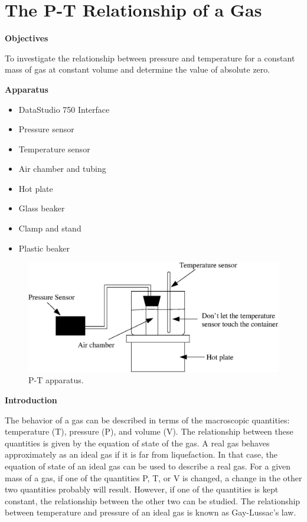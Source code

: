 
\section{The P-T Relationship of a Gas}

\makelabheader %

\textbf{Objectives} 

To investigate the relationship between pressure and temperature for
a constant mass of gas at constant volume and determine the value
of absolute zero.

\textbf{Apparatus} 

\begin{itemize}
\item DataStudio 750 Interface
\item Pressure sensor
\item Temperature sensor
\item Air chamber and tubing
\item Hot plate
\item Glass beaker
\item Clamp and stand
\item Plastic beaker
\end{itemize}
\vspace{0.3cm}

\begin{figure}[hbt]
\begin{center}
\includegraphics[width=6.0in]{P-T_relationship_of_gas/P-T_fig1b.eps}
\caption{P-T apparatus.}
\end{center}
\end{figure}

\textbf{Introduction}

The behavior of a gas can be described in terms of the macroscopic quantities:
temperature (T), pressure (P), and volume (V). The relationship between these
quantities is given by the equation of state of the gas. A real gas behaves
approximately as an ideal gas if it is far from liquefaction. In that case,
the equation of state of an ideal gas can be used to describe a real gas. For
a given mass of a gas, if one of the quantities P, T, or V is changed, a change
in the other two quantities probably will result. However, if one of the 
quantities is kept constant, the relationship between the other two can be 
studied. The relationship between temperature and pressure of an ideal gas is 
known as Gay-Lussac's law.

